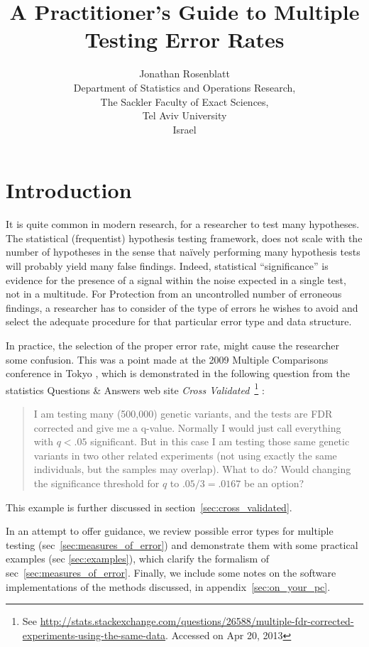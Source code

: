 \documentclass[review,12pt]{article}
\title{A Practitioner's Guide to Multiple Testing Error Rates}
\author{Jonathan Rosenblatt \\
	Department of Statistics and Operations Research,\\
	The Sackler Faculty of Exact Sciences, \\
	Tel Aviv University \\ 
	Israel}
\date{}
\begin{document}
\maketitle


\section{Introduction}

It is quite common in modern research, for a researcher to test many hypotheses. 
The statistical (frequentist) hypothesis testing framework, does not scale with the number of hypotheses in the sense that na\"{i}vely performing many hypothesis tests will probably yield many false findings. 
Indeed, statistical ``significance'' is evidence for the presence of a signal within the noise expected in a single test, not in a multitude. 
For Protection from an uncontrolled number of erroneous findings, a researcher has to consider of the type of errors he wishes to avoid and select the adequate procedure for that particular error type and data structure. 

In practice, the selection of the proper error rate, might cause the researcher some confusion. This was a point made at the 2009 Multiple Comparisons conference in Tokyo \citep[][section 4.4]{benjamini_simultaneous_2010}, which is demonstrated in the following question from the statistics Questions \& Answers web site \emph{Cross Validated}~\footnote{ See \url{http://stats.stackexchange.com/questions/26588/multiple-fdr-corrected-experiments-using-the-same-data}. Accessed on Apr 20, 2013} :
\begin{quotation}
I am testing many (500,000) genetic variants, and the tests are FDR corrected and give me a q-value. Normally I would just call everything with $q < .05$ significant. But in this case I am testing those same genetic variants in two other related experiments (not using exactly the same individuals, but the samples may overlap). What to do? Would changing the significance threshold for $q$ to $.05/3=.0167$ be an option?
\end{quotation}
This example is  further discussed in section~\ref{sec:cross_validated}. 

In an attempt to offer guidance, we review possible error types for multiple testing (sec~\ref{sec:measures_of_error}) and demonstrate them with some practical examples (sec \ref{sec:examples}), which clarify the formalism of sec~\ref{sec:measures_of_error}. Finally, we include some notes on the software implementations of the methods discussed, in appendix~\ref{sec:on_your_pc}.
\end{document}
